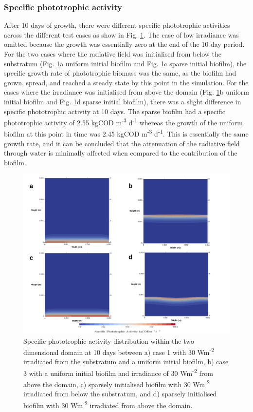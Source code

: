 \subsubsection{Specific phototrophic activity}
After 10 days of growth, there were different specific phototrophic activities across the different test cases as show in Fig. \ref{fig:ch4_spa}. The case of low irradiance was omitted because the growth was essentially zero at the end of the 10 day period. For the two cases where the radiative field was initialised from below the substratum (Fig. \ref{fig:ch4_spa}a uniform initial biofilm and Fig. \ref{fig:ch4_spa}c sparse initial biofilm), the specific growth rate of phototrophic biomass was the same, as the biofilm had grown, spread, and reached a steady state by this point in the simulation. For the cases where the irradiance was initialised from above the domain (Fig. \ref{fig:ch4_spa}b uniform initial biofilm and Fig. \ref{fig:ch4_spa}d sparse initial biofilm), there was a slight difference in specific phototrophic activity at 10 days. The sparse biofilm had a specific phototrophic activity of 2.55 kgCOD m\textsuperscript{-3} d\textsuperscript{-1} whereas the growth of the uniform biofilm at this point in time was 2.45 kgCOD m\textsuperscript{-3} d\textsuperscript{-1}. This is essentially the same growth rate, and it can be concluded that the attenuation of the radiative field through water is minimally affected when compared to the contribution of the biofilm. 

\begin{figure}[H]
    \centering
    \includegraphics[width=\textwidth,height=0.5\textheight]{Chap4/results/post_processing/2D_cases/comparative/spa.pdf}
    \caption{Specific phototrophic activity distribution within the two dimensional domain at 10 days between a) case 1 with 30 Wm\textsuperscript{-2} irradiated from the substratum and a uniform initial biofilm, b) case 3 with a uniform initial biofilm and irradiance of 30 Wm\textsuperscript{-2} from above the domain, c) sparsely initialised biofilm with 30 Wm\textsuperscript{-2} irradiated from below the substratum, and d) sparsely initialised biofilm with 30 Wm\textsuperscript{-2} irradiated from above the domain.  } 
    \label{fig:ch4_spa}
\end{figure}

